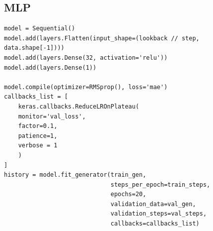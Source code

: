 \documentclass[11pt]{article}
\begin{document}
\subsection{MLP}
\label{sec:org61defcb}
\begin{verbatim}
model = Sequential()
model.add(layers.Flatten(input_shape=(lookback // step, data.shape[-1])))
model.add(layers.Dense(32, activation='relu'))
model.add(layers.Dense(1))

model.compile(optimizer=RMSprop(), loss='mae')
callbacks_list = [
    keras.callbacks.ReduceLROnPlateau(
    monitor='val_loss',
    factor=0.1,
    patience=1,
    verbose = 1
    )
]
history = model.fit_generator(train_gen,
                              steps_per_epoch=train_steps,
                              epochs=20,
                              validation_data=val_gen,
                              validation_steps=val_steps,
                              callbacks=callbacks_list)
\end{verbatim}
\end{document}
